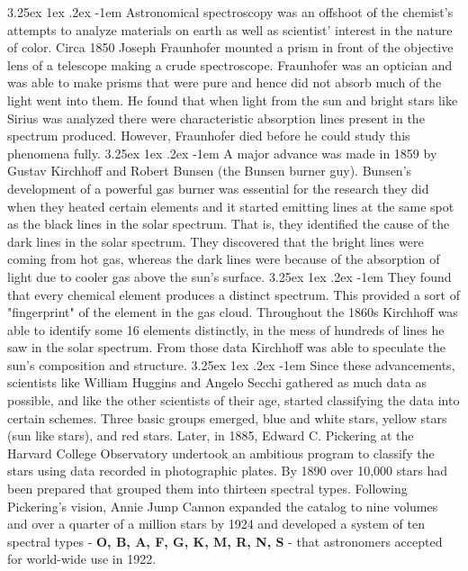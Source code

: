 \documentclass[a4paper,twoside,11pt]{article}
\makeatletter
\numberwithin{equation}{section}
\renewcommand\paragraph{\@startsection{paragraph}{5}{\z@}%
  {3.25ex \@plus1ex \@minus.2ex}%
  {-1em}%
  {\normalfont\normalsize\bfseries}}
\makeatother
\begin{document}
\paragraph{}
Astronomical spectroscopy was an offshoot of the chemist's attempts to analyze materials on earth as well as scientist' interest in the nature of color. Circa 1850 Joseph Fraunhofer mounted a prism in front of the objective lens of a telescope making a crude spectroscope. Fraunhofer was an optician and was able to make prisms that were pure and hence did not absorb much of the light went into them. He found that when light from the sun and bright stars like Sirius was analyzed there were characteristic absorption lines present in the spectrum produced. However, Fraunhofer died before he could study this phenomena fully. 
\paragraph{}
A major advance was made in 1859 by Gustav Kirchhoff and Robert Bunsen (the Bunsen burner guy). Bunsen's development of a powerful gas burner was essential for the research they did when they heated certain elements and it started emitting lines at the same spot as the black lines in the solar spectrum. That is, they identified the cause of the dark lines in the solar spectrum. They discovered that the bright lines were coming from hot gas, whereas the dark lines were because of the absorption of light due to cooler gas above the sun's surface. 
\paragraph{}
They found that every chemical element produces a distinct spectrum. This provided a sort of "fingerprint" of the element in the gas cloud. Throughout the 1860s Kirchhoff was able to identify some 16 elements distinctly, in the mess of hundreds of lines he saw in the solar spectrum. From those data Kirchhoff was able to speculate the sun's composition and structure. 
\paragraph{}
Since these advancements, scientists like William Huggins and Angelo Secchi gathered as much data as possible, and like the other scientists of their age, started classifying the data into certain schemes. Three basic groups emerged, blue and white stars, yellow stars (sun like stars), and red stars. Later, in 1885, Edward C. Pickering at the Harvard College Observatory undertook an ambitious program to classify the stars using data recorded in photographic plates. By 1890 over 10,000 stars had been prepared that grouped them into thirteen spectral types. Following Pickering's vision, Annie Jump Cannon expanded the catalog to nine volumes and over a quarter of a million stars by 1924 and developed a system of ten spectral types - \textbf{O, B, A, F, G, K, M, R, N, S} - that astronomers accepted for world-wide use in 1922. 
\end{document}
